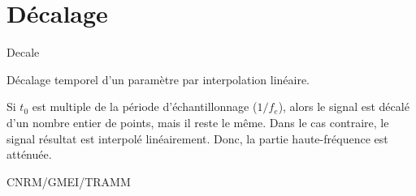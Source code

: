 %
\section{D\'ecalage}

 {\sf Decale}

D\'ecalage temporel d'un param\`etre par
interpolation lin\'eaire. 

\bigskip






Si $t_0$ est multiple de la p\'eriode
d'\'echantillonnage ($1/f_e$), alors le signal
est d\'ecal\'e d'un nombre entier de points, mais il
reste le m\^eme. Dans le cas contraire, 
le signal r\'esultat est interpol\'e 
lin\'eairement. Donc,  
la partie haute-fr\'equence est att\'enu\'ee. 

CNRM/GMEI/TRAMM

